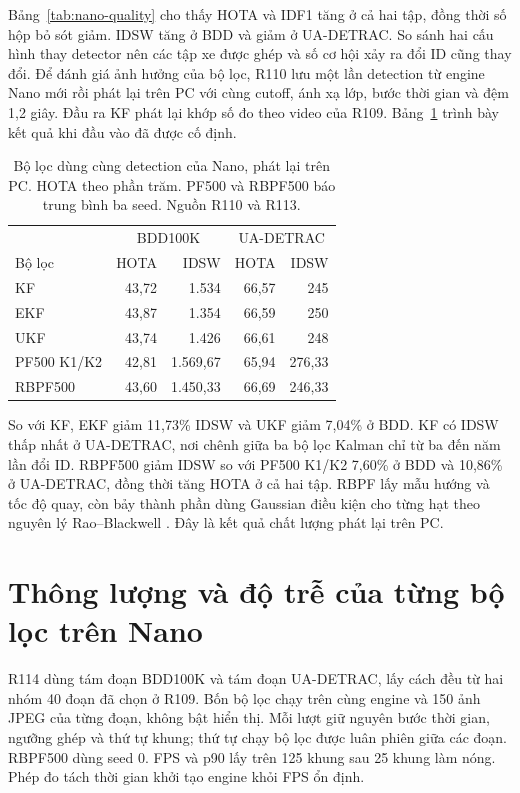 Bảng~\ref{tab:nano-quality} cho thấy HOTA và IDF1 tăng ở cả hai tập, đồng thời số hộp bỏ sót giảm. IDSW tăng ở BDD và giảm ở UA-DETRAC. So sánh hai cấu hình thay detector nên các tập xe được ghép và số cơ hội xảy ra đổi ID cũng thay đổi. Để đánh giá ảnh hưởng của bộ lọc, R110 lưu một lần detection từ engine Nano mới rồi phát lại trên PC với cùng cutoff, ánh xạ lớp, bước thời gian và đệm 1,2 giây. Đầu ra KF phát lại khớp số đo theo video của R109. Bảng~\ref{tab:nano-filters} trình bày kết quả khi đầu vào đã được cố định.

\begin{table}[htbp]\centering\small
\caption{Bộ lọc dùng cùng detection của Nano, phát lại trên PC. HOTA theo phần trăm. PF500 và RBPF500 báo trung bình ba seed. Nguồn R110 và R113.}\label{tab:nano-filters}
\begin{tabular}{lrrrr}\toprule
 & \multicolumn{2}{c}{BDD100K} & \multicolumn{2}{c}{UA-DETRAC}\\
Bộ lọc & HOTA & IDSW & HOTA & IDSW\\\midrule
KF & 43,72 & 1.534 & 66,57 & 245\\
EKF & 43,87 & 1.354 & 66,59 & 250\\
UKF & 43,74 & 1.426 & 66,61 & 248\\
PF500 K1/K2 & 42,81 & 1.569,67 & 65,94 & 276,33\\
RBPF500 & 43,60 & 1.450,33 & 66,69 & 246,33\\\bottomrule
\end{tabular}
\end{table}

So với KF, EKF giảm 11,73\% IDSW và UKF giảm 7,04\% ở BDD. KF có IDSW thấp nhất ở UA-DETRAC, nơi chênh giữa ba bộ lọc Kalman chỉ từ ba đến năm lần đổi ID. RBPF500 giảm IDSW so với PF500 K1/K2 7,60\% ở BDD và 10,86\% ở UA-DETRAC, đồng thời tăng HOTA ở cả hai tập. RBPF lấy mẫu hướng và tốc độ quay, còn bảy thành phần dùng Gaussian điều kiện cho từng hạt theo nguyên lý Rao--Blackwell \cite{doucet_rbpf}. Đây là kết quả chất lượng phát lại trên PC.

\section{Thông lượng và độ trễ của từng bộ lọc trên Nano}
R114 dùng tám đoạn BDD100K và tám đoạn UA-DETRAC, lấy cách đều từ hai nhóm 40 đoạn đã chọn ở R109. Bốn bộ lọc chạy trên cùng engine và 150 ảnh JPEG của từng đoạn, không bật hiển thị. Mỗi lượt giữ nguyên bước thời gian, ngưỡng ghép và thứ tự khung; thứ tự chạy bộ lọc được luân phiên giữa các đoạn. RBPF500 dùng seed 0. FPS và p90 lấy trên 125 khung sau 25 khung làm nóng. Phép đo tách thời gian khởi tạo engine khỏi FPS ổn định.

